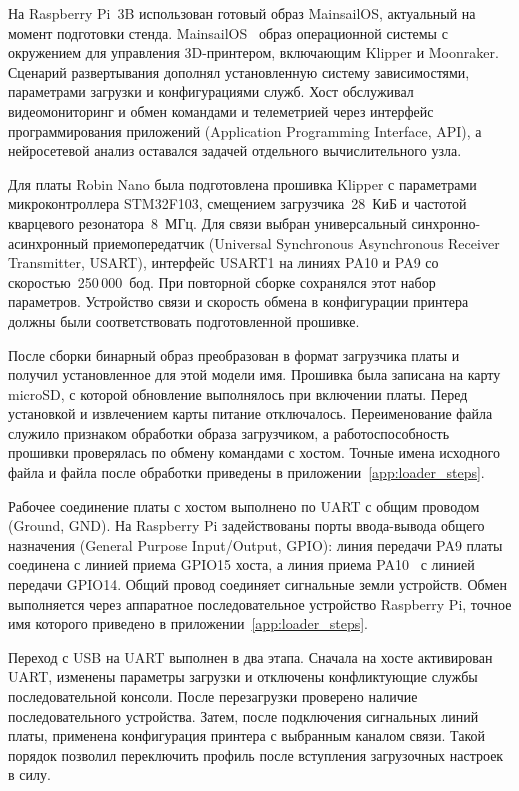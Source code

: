 На Raspberry Pi~3B использован готовый образ MainsailOS, актуальный на момент подготовки стенда. MainsailOS~\textemdash{} образ операционной системы с окружением для управления 3D-принтером, включающим Klipper и Moonraker. Сценарий развертывания дополнял установленную систему зависимостями, параметрами загрузки и конфигурациями служб. Хост обслуживал видеомониторинг и обмен командами и телеметрией через интерфейс программирования приложений (Application Programming Interface, API), а нейросетевой анализ оставался задачей отдельного вычислительного узла.

Для платы Robin Nano была подготовлена прошивка Klipper с параметрами микроконтроллера STM32F103, смещением загрузчика~28~КиБ и частотой кварцевого резонатора~8~МГц. Для связи выбран универсальный синхронно-асинхронный приемопередатчик (Universal Synchronous Asynchronous Receiver Transmitter, USART), интерфейс USART1 на линиях PA10 и PA9 со скоростью~250\,000~бод. При повторной сборке сохранялся этот набор параметров. Устройство связи и скорость обмена в конфигурации принтера должны были соответствовать подготовленной прошивке.

После сборки бинарный образ преобразован в формат загрузчика платы и получил установленное для этой модели имя. Прошивка была записана на карту microSD, с которой обновление выполнялось при включении платы. Перед установкой и извлечением карты питание отключалось. Переименование файла служило признаком обработки образа загрузчиком, а работоспособность прошивки проверялась по обмену командами с хостом. Точные имена исходного файла и файла после обработки приведены в приложении~\ref{app:loader_steps}.

Рабочее соединение платы с хостом выполнено по UART с общим проводом (Ground, GND). На Raspberry Pi задействованы порты ввода-вывода общего назначения (General Purpose Input/Output, GPIO): линия передачи PA9 платы соединена с линией приема GPIO15 хоста, а линия приема PA10~\textemdash{} с линией передачи GPIO14. Общий провод соединяет сигнальные земли устройств. Обмен выполняется через аппаратное последовательное устройство Raspberry Pi, точное имя которого приведено в приложении~\ref{app:loader_steps}.

Переход с USB на UART выполнен в два этапа. Сначала на хосте активирован UART, изменены параметры загрузки и отключены конфликтующие службы последовательной консоли. После перезагрузки проверено наличие последовательного устройства. Затем, после подключения сигнальных линий платы, применена конфигурация принтера с выбранным каналом связи. Такой порядок позволил переключить профиль после вступления загрузочных настроек в силу.

